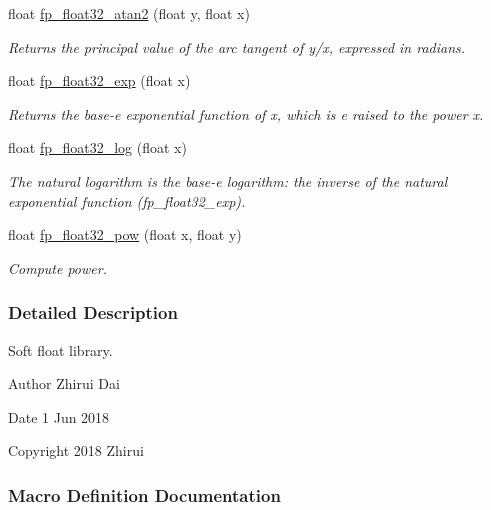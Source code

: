 \begin{DoxyCompactItemize}
float \mbox{\hyperlink{a00023_aa7b8601248d31c15f917e4d8f4f6e9d9}{fp\+\_\+float32\+\_\+atan2}} (float y, float x)
\begin{DoxyCompactList}\small\item\em Returns the principal value of the arc tangent of y/x, expressed in radians. \end{DoxyCompactList}\item 
float \mbox{\hyperlink{a00023_a595d6a7d9a0a116f0db5bd4cfdbcd166}{fp\+\_\+float32\+\_\+exp}} (float x)
\begin{DoxyCompactList}\small\item\em Returns the base-\/e exponential function of x, which is e raised to the power x. \end{DoxyCompactList}\item 
float \mbox{\hyperlink{a00023_a694db5e30e3f76718f29bacd4e044135}{fp\+\_\+float32\+\_\+log}} (float x)
\begin{DoxyCompactList}\small\item\em The natural logarithm is the base-\/e logarithm\+: the inverse of the natural exponential function (fp\+\_\+float32\+\_\+exp). \end{DoxyCompactList}\item 
float \mbox{\hyperlink{a00023_ac888f98a6e5d89837b647d2c81725836}{fp\+\_\+float32\+\_\+pow}} (float x, float y)
\begin{DoxyCompactList}\small\item\em Compute power. \end{DoxyCompactList}\end{DoxyCompactItemize}


\subsubsection{Detailed Description}
Soft float library. 

\begin{DoxyAuthor}{Author}
Zhirui Dai 
\end{DoxyAuthor}
\begin{DoxyDate}{Date}
1 Jun 2018 
\end{DoxyDate}
\begin{DoxyCopyright}{Copyright}
2018 Zhirui 
\end{DoxyCopyright}


\subsubsection{Macro Definition Documentation}
\mbox{\label{a00023_a7eee275c4550a21c03be987913256c82}} 
